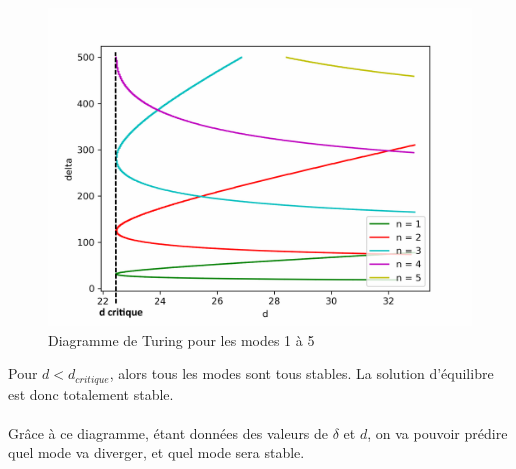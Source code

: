 \documentclass[12pt,a4paper]{article}
\begin{document}
\begin{figure}[h!]
\begin{center}
\includegraphics[scale=0.8]{diagrammes_turing_bis_avec_d_crit.png}
\caption{Diagramme de Turing pour les modes 1 à 5}
\end{center}
\end{figure}

Pour $d<d_{critique}$, alors tous les modes sont tous stables. La solution d'équilibre est donc totalement stable. \\ \\
Grâce à ce diagramme, étant données des valeurs de $\delta$ et $d$, on va pouvoir prédire quel mode va diverger, et quel mode sera stable.
\end{document}
